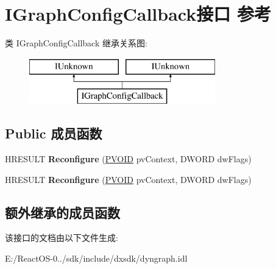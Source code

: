 \hypertarget{interface_i_graph_config_callback}{}\section{I\+Graph\+Config\+Callback接口 参考}
\label{interface_i_graph_config_callback}
类 I\+Graph\+Config\+Callback 继承关系图\+:\begin{figure}[H]
\begin{center}
\leavevmode
\includegraphics[height=2.000000cm]{interface_i_graph_config_callback}
\end{center}
\end{figure}
\subsection*{Public 成员函数}
\begin{DoxyCompactItemize}
\item 
\mbox{\label{interface_i_graph_config_callback_ab7c46e34c57626e21c60db5aa6b30e9a}} 
H\+R\+E\+S\+U\+LT {\bfseries Reconfigure} (\hyperlink{interfacevoid}{P\+V\+O\+ID} pv\+Context, D\+W\+O\+RD dw\+Flags)
\item 
\mbox{\label{interface_i_graph_config_callback_ab7c46e34c57626e21c60db5aa6b30e9a}} 
H\+R\+E\+S\+U\+LT {\bfseries Reconfigure} (\hyperlink{interfacevoid}{P\+V\+O\+ID} pv\+Context, D\+W\+O\+RD dw\+Flags)
\end{DoxyCompactItemize}
\subsection*{额外继承的成员函数}


该接口的文档由以下文件生成\+:\begin{DoxyCompactItemize}
\item 
E\+:/\+React\+O\+S-\/0../sdk/include/dxsdk/dyngraph.\+idl\end{DoxyCompactItemize}
